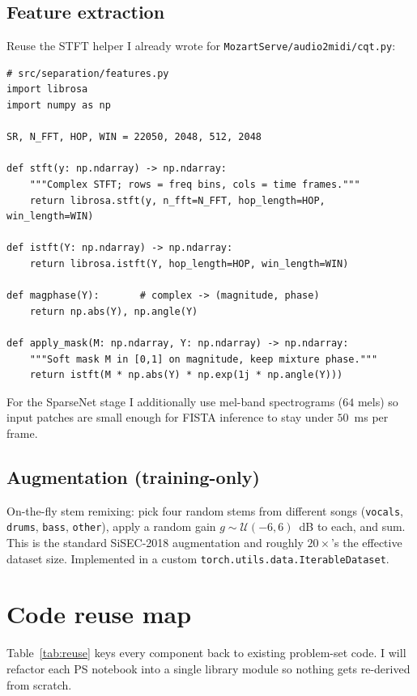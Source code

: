\documentclass[10pt]{article}
\begin{document}
\subsection*{Feature extraction}
Reuse the STFT helper I already wrote for \texttt{MozartServe/audio2midi/cqt.py}:
\begin{lstlisting}
# src/separation/features.py
import librosa
import numpy as np

SR, N_FFT, HOP, WIN = 22050, 2048, 512, 2048

def stft(y: np.ndarray) -> np.ndarray:
    """Complex STFT; rows = freq bins, cols = time frames."""
    return librosa.stft(y, n_fft=N_FFT, hop_length=HOP, win_length=WIN)

def istft(Y: np.ndarray) -> np.ndarray:
    return librosa.istft(Y, hop_length=HOP, win_length=WIN)

def magphase(Y):       # complex -> (magnitude, phase)
    return np.abs(Y), np.angle(Y)

def apply_mask(M: np.ndarray, Y: np.ndarray) -> np.ndarray:
    """Soft mask M in [0,1] on magnitude, keep mixture phase."""
    return istft(M * np.abs(Y) * np.exp(1j * np.angle(Y)))
\end{lstlisting}
For the SparseNet stage I additionally use mel-band spectrograms
($64$ mels) so input patches are small enough for FISTA inference to stay
under $50$~ms per frame.

\subsection*{Augmentation (training-only)}
On-the-fly stem remixing: pick four random stems from different songs
(\texttt{vocals}, \texttt{drums}, \texttt{bass}, \texttt{other}), apply
a random gain $g\sim\mathcal{U}(-6, 6)$~dB to each, and sum.  This is
the standard SiSEC-2018 augmentation and roughly $20\times$'s the
effective dataset size.  Implemented in a custom
\texttt{torch.utils.data.IterableDataset}.

\section{Code reuse map}
Table~\ref{tab:reuse} keys every component back to existing problem-set
code.  I will refactor each PS notebook into a single library module so
nothing gets re-derived from scratch.
\end{document}
